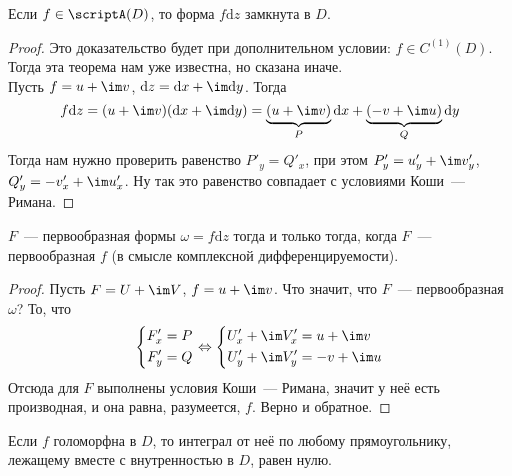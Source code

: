 \documentclass{article}
\begin{document}
    \begin{theorem}
        \label{Интегральная теорема Коши}
        Если $f\in\scriptA(D)$, то форма $f\mathrm dz$ замкнута в $D$.
    \end{theorem}
    \begin{proof}
        Это доказательство будет при дополнительном условии: $f\in C^{(1)}(D)$. Тогда эта теорема нам уже известна, но сказана иначе.\\
        Пусть $f=u+\im v$, $\mathrm dz=\mathrm dx+\im\mathrm dy$. Тогда
        $$
        f\mathrm dz=(u+\im v)(\mathrm dx+\im\mathrm dy)=\underbrace{(u+\im v)}_P\mathrm dx+\underbrace{(-v+\im u)}_Q\mathrm dy
        $$
        Тогда нам нужно проверить равенство $P'_y=Q'_x$, при этом $P'_y=u'_y+\im v'_y$, $Q'_y=-v'_x+\im u'_x$. Ну так это равенство совпадает с условиями Коши~--- Римана.
    \end{proof}
    \begin{claim}
        $F$~--- первообразная формы $\omega=f\mathrm dz$ тогда и только тогда, когда $F$~--- первообразная $f$ (в смысле комплексной дифференцируемости).
    \end{claim}
    \begin{proof}
        Пусть $F=U+\im V$, $f=u+\im v$. Что значит, что $F$~--- первообразная $\omega$? То, что
        $$
        \left\{\begin{aligned}
            F'_x&=P\\
            F'_y&=Q
        \end{aligned}\right.\Leftrightarrow
        \left\{\begin{aligned}
            U'_x+\im V'_x&=u+\im v\\
            U'_y+\im V'_y&=-v+\im u
        \end{aligned}\right.
        $$
        Отсюда для $F$ выполнены условия Коши~--- Римана, значит у неё есть производная, и она равна, разумеется, $f$. Верно и обратное.
    \end{proof}
    \begin{lemma}
        \label{Лемма Гурса}
        Если $f$ голоморфна в $D$, то интеграл от неё по любому прямоугольнику, лежащему вместе с внутренностью в $D$, равен нулю.
    \end{lemma}
\end{document}
